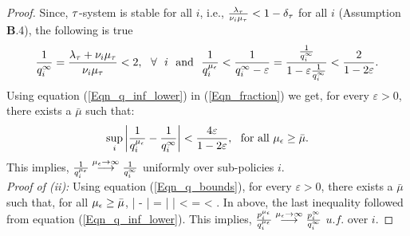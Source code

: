 \begin{proof}
	
	Since, ${\tau}$-system is stable for all $i$, i.e., $\frac{\lambda_{\tau}}{\nu_i\mu_{\tau}} < 1 -\delta_{\tau}$   for all $i$ (Assumption {\bf B}.4), the following is true
	\begin{eqnarray}
	\label{Eqn_q_inf_lower}
	\frac{1}{q_i^\infty} = \frac{\lambda_\tau + \nu_i \mu_\tau}{\nu_i \mu_\tau}
	< 2, \ \ \forall \ \ i \  \mbox{ and } \    \frac{1}{q_i^{\mu_\epsilon}} < \frac{1}{q_i^\infty - \varepsilon} =   \frac{  \frac{1}{q_i^\infty} }{1- \varepsilon   \frac{1}{q_i^\infty}}  < \frac{2}{1 - 2 \varepsilon}.
	\end{eqnarray}
	Using equation (\ref{Eqn_q_inf_lower}) in   (\ref{Eqn_fraction}) we get, for every $\varepsilon > 0$, there exists a $\bar{\mu}$ such that:
	\begin{eqnarray}
	\sup_i	\bigg| \frac{1}{q_i^{\mu_\epsilon}} - \frac{1}{q_i^\infty} \bigg| < \frac{4\varepsilon}{1 - 2 \varepsilon},  \ \   \mbox{for all} \  \mu_\epsilon \geq \bar{\mu}. 
	\end{eqnarray}
	This implies, $\frac{1}{q_i^{\mu_\epsilon}} \stackrel{{\mu_\epsilon} \to \infty }{ \longrightarrow} \frac{1}{q_i^{\infty}}$ uniformly over sub-policies $i$.\\
	
	{\it  Proof of (ii):}
	Using equation (\ref{Eqn_q_bounds}), for every $\varepsilon > 0$, there exists a $\bar{\mu}$ such that, for all ${\mu_\epsilon} \geq \bar{\mu}$,
	\beq
	\bigg|  -    \bigg| 
	= \bigg|    \bigg| 
	\leq {}
	<  
	=  
	<
	.
	\eeq
	In above, the last inequality followed from equation (\ref{Eqn_q_inf_lower}).
	This implies, $\frac{p_i^{\mu_\epsilon}}{q_i^{\mu_\epsilon}} \stackrel{{\mu_\epsilon} \to \infty}{\longrightarrow}  \frac{p_i^\infty}{q_i^\infty}$ $u.f.$ over $i$.
	


\end{proof}

